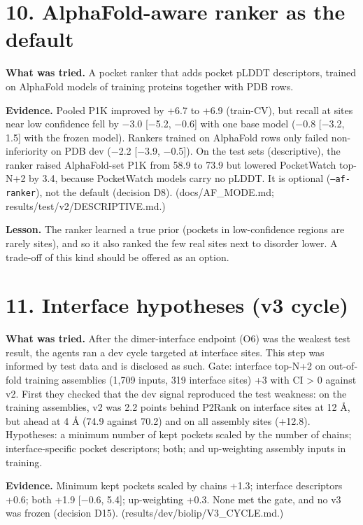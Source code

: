 \documentclass[10pt,letterpaper]{article}
\begin{document}
\section*{10. AlphaFold-aware ranker as the default}

\textbf{What was tried.} A pocket ranker that adds pocket pLDDT descriptors, trained on AlphaFold models of training proteins together with PDB rows.

\textbf{Evidence.} Pooled P1K improved by +6.7 to +6.9 (train-CV), but recall at sites near low confidence fell by $-$3.0 [$-$5.2, $-$0.6] with one base model ($-$0.8 [$-$3.2, 1.5] with the frozen model). Rankers trained on AlphaFold rows only failed non-inferiority on PDB dev ($-$2.2 [$-$3.9, $-$0.5]). On the test sets (descriptive), the ranker raised AlphaFold-set P1K from 58.9 to 73.9 but lowered PocketWatch top-N+2 by 3.4, because PocketWatch models carry no pLDDT. It is optional (\texttt{--af-ranker}), not the default (decision D8). (docs/AF\_MODE.md; results/test/v2/DESCRIPTIVE.md.)

\textbf{Lesson.} The ranker learned a true prior (pockets in low-confidence regions are rarely sites), and so it also ranked the few real sites next to disorder lower. A trade-off of this kind should be offered as an option.

\section*{11. Interface hypotheses (v3 cycle)}

\textbf{What was tried.} After the dimer-interface endpoint (O6) was the weakest test result, the agents ran a dev cycle targeted at interface sites. This step was informed by test data and is disclosed as such. Gate: interface top-N+2 on out-of-fold training assemblies (1,709 inputs, 319 interface sites) +3 with CI \textgreater{} 0 against v2. First they checked that the dev signal reproduced the test weakness: on the training assemblies, v2 was 2.2 points behind P2Rank on interface sites at 12 \AA{}, but ahead at 4 \AA{} (74.9 against 70.2) and on all assembly sites (+12.8). Hypotheses: a minimum number of kept pockets scaled by the number of chains; interface-specific pocket descriptors; both; and up-weighting assembly inputs in training.

\textbf{Evidence.} Minimum kept pockets scaled by chains +1.3; interface descriptors +0.6; both +1.9 [$-$0.6, 5.4]; up-weighting +0.3. None met the gate, and no v3 was frozen (decision D15). (results/dev/biolip/V3\_CYCLE.md.)
\end{document}
